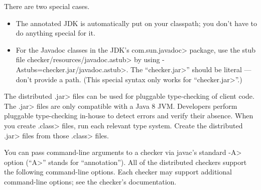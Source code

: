 
There are two special cases.
\begin{itemize}
\item
The annotated JDK is automatically put on your
classpath; you don't have to do anything special for it.
\item
For the Javadoc classes in the JDK's \<com.sun.javadoc> package,
use the stub file \<checker/resources/javadoc.astub> by using \<-Astubs=checker.jar/javadoc.astub>.
The ``\<checker.jar>'' should be literal --- don't provide a path.
(This special syntax only works for ``\<checker.jar>''.)
\end{itemize}



  The distributed
  \<.jar> files can be used for pluggable type-checking of client code.
  The \<.jar> files are only compatible with a Java 8
  JVM.
  Developers perform pluggable type-checking in-house to detect errors and
  verify their absence.
  When you create \<.class> files, run each relevant type system.
  Create the distributed \<.jar> files from those \<.class> files.



You can pass command-line arguments to a checker via javac's standard \<-A>
option (``\<A>'' stands for ``annotation'').  All of the distributed
checkers support the following command-line options.
Each checker may support additional command-line options; see the checker's
documentation.


